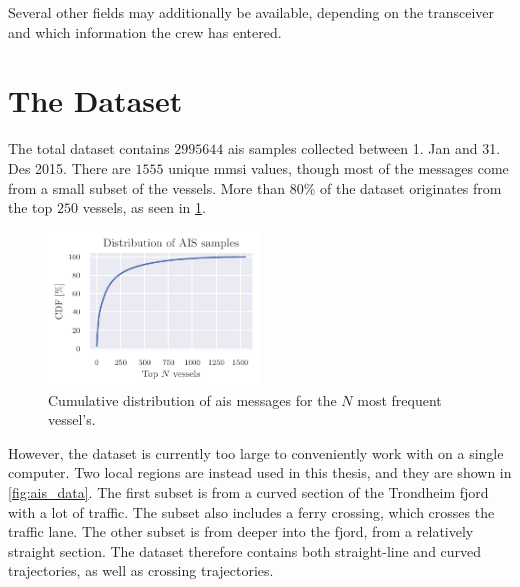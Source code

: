 Several other fields may additionally be available, depending on the transceiver and which information the crew has entered. 

\section{The Dataset}
The total dataset contains $2995644$ \acrshort{ais} samples collected between 1. Jan and 31. Des 2015. There are $1555$ unique \acrshort{mmsi} values, though most of the messages come from a small subset of the vessels. More than $80\%$ of the dataset originates from the top $250$ vessels, as seen in \cref{fig:ais_cdf}.

\begin{figure}[h]
    \centering
    \includegraphics[width=0.5\textwidth]{figures/mmsi_cdf.pdf}
    \caption{Cumulative distribution of \acrshort{ais} messages for the $N$ most frequent vessel's.}
    \label{fig:ais_cdf}
\end{figure}

However, the dataset is currently too large to conveniently work with on a single computer. Two local regions are instead used in this thesis, and they are shown in \cref{fig:ais_data}. The first subset is from a curved section of the Trondheim fjord with a lot of traffic. The subset also includes a ferry crossing, which crosses the traffic lane. The other subset is from deeper into the fjord, from a relatively straight section. The dataset therefore contains both straight-line and curved trajectories, as well as crossing trajectories. 

